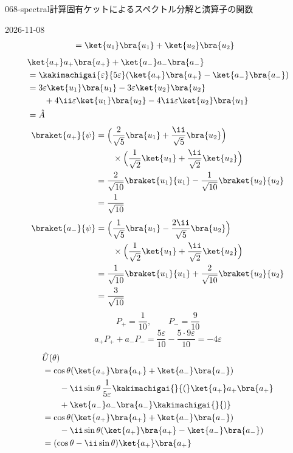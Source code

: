 \documentclass[uplatex,dvipdfmx,a4paper,11pt]{jsarticle}
\begin{document}
\begin{mondai}{068-spectral}{計算}{固有ケットによるスペクトル分解と演算子の関数}
\begin{kotaeutsushi}{2026-11-08}
\begin{align*}
&=\ket{u_{1}}\bra{u_{1}}+\ket{u_{2}}\bra{u_{2}}
\end{align*}
\begin{align*}
&\ket{a_{+}}a_{+}\bra{a_{+}}+\ket{a_{-}}a_{-}\bra{a_{-}}\\
&=\kakimachigai{\varepsilon}{5\varepsilon}(\ket{a_{+}}\bra{a_{+}}-\ket{a_{-}}\bra{a_{-}})\\
&=3\varepsilon\ket{u_{1}}\bra{u_{1}}-3\varepsilon\ket{u_{2}}\bra{u_{2}}\\
&\qquad+4\ii\varepsilon\ket{u_{1}}\bra{u_{2}}-4\ii\varepsilon\ket{u_{2}}\bra{u_{1}}\\
&=\hat{A}
\end{align*}
\begin{align*}
\braket{a_{+}}{\psi}&=\Bigl(\frac{2}{\sqrt{5}}\bra{u_{1}}+\frac{\ii}{\sqrt{5}}\bra{u_{2}}\Bigr)\\
&\qquad\times\Bigl(\frac{1}{\sqrt{2}}\ket{u_{1}}+\frac{\ii}{\sqrt{2}}\ket{u_{2}}\Bigr)\\
&=\frac{2}{\sqrt{10}}\braket{u_{1}}{u_{1}}-\frac{1}{\sqrt{10}}\braket{u_{2}}{u_{2}}\\
&=\frac{1}{\sqrt{10}}
\end{align*}
\begin{align*}
\braket{a_{-}}{\psi}&=\Bigl(\frac{1}{\sqrt{5}}\bra{u_{1}}-\frac{2\ii}{\sqrt{5}}\bra{u_{2}}\Bigr)\\
&\qquad\times\Bigl(\frac{1}{\sqrt{2}}\ket{u_{1}}+\frac{\ii}{\sqrt{2}}\ket{u_{2}}\Bigr)\\
&=\frac{1}{\sqrt{10}}\braket{u_{1}}{u_{1}}+\frac{2}{\sqrt{10}}\braket{u_{2}}{u_{2}}\\
&=\frac{3}{\sqrt{10}}
\end{align*}
\[ P_{+}=\frac{1}{10},\qquad P_{-}=\frac{9}{10} \]
\[ a_{+}P_{+}+a_{-}P_{-}=\frac{5\varepsilon}{10}-\frac{5\cdot9\varepsilon}{10}=-4\varepsilon \]
\begin{align*}
&\hat{U}(\theta)\\
&=\cos\theta(\ket{a_{+}}\bra{a_{+}}+\ket{a_{-}}\bra{a_{-}})\\
&\qquad-\ii\sin\theta\,\frac{1}{5\varepsilon}\kakimachigai{}{(}\ket{a_{+}}a_{+}\bra{a_{+}}\\
&\qquad+\ket{a_{-}}a_{-}\bra{a_{-}}\kakimachigai{}{)}\\
&=\cos\theta(\ket{a_{+}}\bra{a_{+}}+\ket{a_{-}}\bra{a_{-}})\\
&\qquad-\ii\sin\theta(\ket{a_{+}}\bra{a_{+}}-\ket{a_{-}}\bra{a_{-}})\\
&=(\cos\theta-\ii\sin\theta)\ket{a_{+}}\bra{a_{+}}\\

\end{align*}
\end{kotaeutsushi}
\end{mondai}
\end{document}
